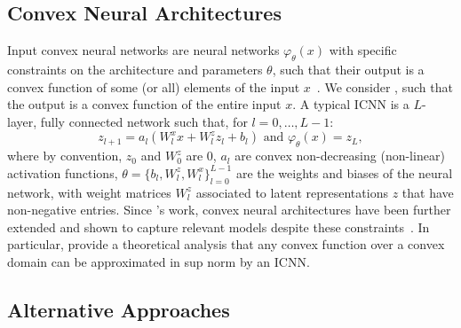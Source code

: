 \subsection{Convex Neural Architectures}
\label{sec:icnns}

Input convex neural networks are neural networks $\varphi_\theta(x)$ with specific constraints on the architecture and parameters $\theta$, such that their output is a convex function of some (or all) elements of the input $x$~\citep{amos2017input}. We consider  , such that the output is a convex function of the entire input $x$. A typical \acrshort{ICNN} is a $L$-layer, fully connected network such that, for $l = 0, \dots, L-1$:
\begin{equation} \label{eq:icnn}
    z_{l+1} = a_l(W^x_lx + W^z_l z_l + b_l)  \text{ and } \varphi_\theta(x) = z_L,
\end{equation}
where by convention, $z_0$ and $W^z_0$ are $0$, $a_l$ are convex non-decreasing (non-linear) activation functions, $\theta=\{b_l, W^z_l, W^x_l\}_{l=0}^{L-1}$ are the weights and biases of the neural network, with weight matrices $W^z_l$ associated to latent representations $z$ that have non-negative entries. Since \citet{amos2017input}'s work, convex neural architectures have been further extended and shown to capture relevant models despite these constraints~\citep{amos2017input, makkuva2020optimal, huang2021convex}. In particular, \citet{chen2018optimal} provide a theoretical analysis that any convex function over a convex domain can be approximated in sup norm by an \acrshort{ICNN}.


\subsection{Alternative Approaches}
\label{sec:other_neural_solvers}


